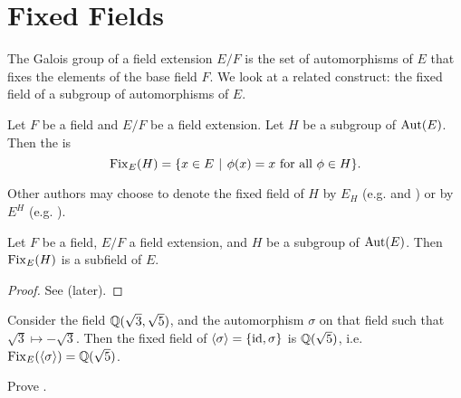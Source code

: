 \section{Fixed Fields}
The Galois group of a field extension $E/F$ is the set of automorphisms of $E$ that fixes the elements of the base field $F$. We look at a related construct: the fixed field of a subgroup of automorphisms of $E$.

\begin{definition}
    Let $F$ be a field and $E/F$ be a field extension. Let $H$ be a subgroup of $\mathrm{Aut}(E)$. Then the  is
    \[
        \Fix{E}{H} = \{x \in E \vert \phi(x) = x \text{ for all } \phi \in H\}.
    \]
\end{definition}
\begin{remark}
    Other authors may choose to denote the fixed field of $H$ by $E_H$ (e.g. \cite[p.~531]{gallian_2016} and \cite[p.~298]{judson_beezer_2022}) or by $E^H$ (e.g. \cite[p.~486]{artin_2011}).
\end{remark}

\begin{proposition}\label{prop-fixed-field-is-subfield}
    Let $F$ be a field, $E/F$ a field extension, and $H$ be a subgroup of $\mathrm{Aut}(E)$. Then $\mathrm{Fix}_{E}(H)$ is a subfield of $E$.
\end{proposition}
\begin{proof}
    See  (later).
\end{proof}

\begin{example}
    Consider the field $\mathbb{Q}(\sqrt3,\sqrt5)$, and the automorphism $\sigma$ on that field such that $\sqrt3 \mapsto -\sqrt3$. Then the fixed field of $\langle\sigma\rangle = \{\mathrm{id}, \sigma\}$ is $\mathbb{Q}(\sqrt5)$, i.e. $\mathrm{Fix}_{E}(\langle\sigma\rangle) = \mathbb{Q}(\sqrt5)$.
\end{example}

\begin{exercise}\label{exercise-fixed-field-is-subfield}
    Prove .
\end{exercise}



